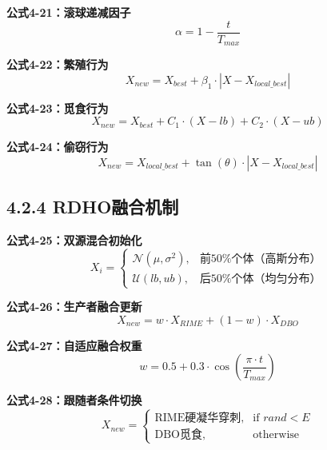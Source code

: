 \documentclass[12pt]{article}
\begin{document}
\textbf{公式4-21：滚球递减因子}
\begin{equation}
\alpha = 1 - \frac{t}{T_{max}}
\end{equation}

\textbf{公式4-22：繁殖行为}
\begin{equation}
X_{new} = X_{best} + \beta_1 \cdot |X - X_{local\_best}|
\end{equation}

\textbf{公式4-23：觅食行为}
\begin{equation}
X_{new} = X_{best} + C_1 \cdot (X - lb) + C_2 \cdot (X - ub)
\end{equation}

\textbf{公式4-24：偷窃行为}
\begin{equation}
X_{new} = X_{local\_best} + \tan(\theta) \cdot |X - X_{local\_best}|
\end{equation}

\subsection{4.2.4 RDHO融合机制}

\textbf{公式4-25：双源混合初始化}
\begin{equation}
X_i = \begin{cases}
\mathcal{N}(\mu, \sigma^2), & \text{前50\%个体（高斯分布）} \\
\mathcal{U}(lb, ub), & \text{后50\%个体（均匀分布）}
\end{cases}
\end{equation}

\textbf{公式4-26：生产者融合更新}
\begin{equation}
X_{new} = w \cdot X_{RIME} + (1 - w) \cdot X_{DBO}
\end{equation}

\textbf{公式4-27：自适应融合权重}
\begin{equation}
w = 0.5 + 0.3 \cdot \cos\left(\frac{\pi \cdot t}{T_{max}}\right)
\end{equation}

\textbf{公式4-28：跟随者条件切换}
\begin{equation}
X_{new} = \begin{cases}
\text{RIME硬凝华穿刺}, & \text{if } rand < E \\
\text{DBO觅食}, & \text{otherwise}
\end{cases}
\end{equation}
\end{document}
